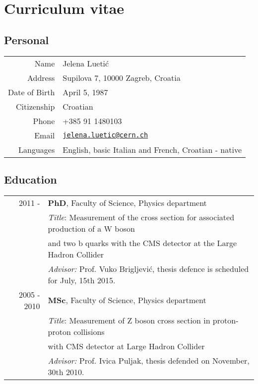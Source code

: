 \chapter*{Curriculum vitae}

\section*{Personal}


  \begin{tabular}{r|l}
    Name & Jelena Luetić \\
	Address & Supilova 7, 10000 Zagreb, Croatia \\   
    Date of Birth & April 5, 1987 \\
    Citizenship & Croatian \\
    Phone & +385 91 1480103 \\
    Email & \href{mailto:jelena.luetic@cern.ch}{\tt jelena.luetic@cern.ch} \\
    Languages & English, basic Italian and French, Croatian - native \\
  \end{tabular}



\section*{Education}

\begin{table}[h!]
 \centering
\begin{tabular}{r | l}
2011 - & \textbf{PhD}, Faculty of Science, Physics department \\ & \textit{Title}: 
Measurement of the cross section for associated production of a W boson \\ & and two b quarks with the CMS detector at the Large Hadron Collider \\ &  \textit{Advisor:} Prof. Vuko Brigljević, thesis defence is scheduled for July, 15th 2015. \\[5pt] 
2005 - 2010 & \textbf{MSc}, Faculty of Science, Physics department \\  & \textit{Title}: Measurement of Z boson cross section in proton-proton collisions \\ & with CMS detector at Large Hadron Collider \\ &  \textit{Advisor:} Prof. Ivica Puljak, thesis defended on November, 30th 2010. \\ 
\end{tabular}
\end{table}


